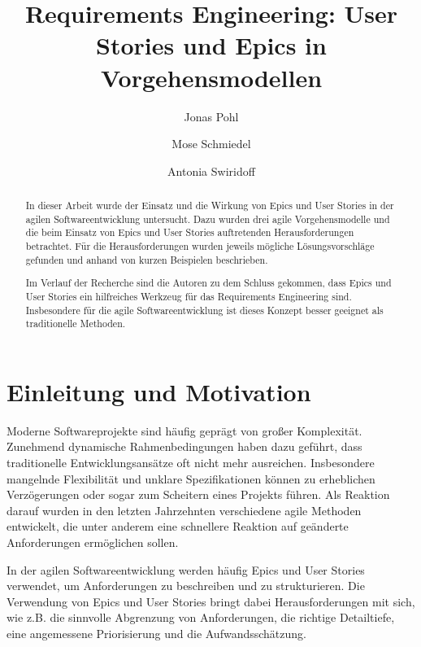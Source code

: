 \documentclass[acmtog]{acmart}
\begin{document}
\hypersetup{
	colorlinks,
	allcolors=blue,
	citecolor=.,
}

\title{Requirements Engineering: User Stories und Epics in Vorgehensmodellen}

\author{Jonas Pohl}
\author{Mose Schmiedel}
\authornotemark[1]
\author{Antonia Swiridoff}
\authornotemark[1]

\renewcommand{\shortauthors}{Pohl, Schmiedel and Swiridoff}

\begin{abstract}
	In dieser Arbeit wurde der Einsatz und die Wirkung von Epics und User Stories in der agilen Softwareentwicklung untersucht.
	Dazu wurden drei agile Vorgehensmodelle und die beim Einsatz von Epics und User Stories
	auftretenden Herausforderungen betrachtet.
	Für die Herausforderungen wurden jeweils mögliche Lösungsvorschläge gefunden und anhand von kurzen Beispielen beschrieben.

	Im Verlauf der Recherche sind die Autoren zu dem Schluss gekommen, dass Epics und User Stories ein hilfreiches Werkzeug
	für das Requirements Engineering sind. Insbesondere für die agile Softwareentwicklung ist dieses Konzept besser geeignet als traditionelle
	Methoden.
\end{abstract}

\maketitle

\section{Einleitung und Motivation}
Moderne Softwareprojekte sind häufig geprägt von großer Komplexität.
Zunehmend dynamische Rahmenbedingungen haben dazu geführt, dass traditionelle Entwicklungsansätze oft nicht mehr ausreichen.
Insbesondere mangelnde Flexibilität und unklare Spezifikationen können zu erheblichen Verzögerungen oder sogar zum Scheitern eines Projekts führen.
Als Reaktion darauf wurden in den letzten Jahrzehnten verschiedene agile Methoden entwickelt, die unter anderem eine schnellere Reaktion auf geänderte Anforderungen ermöglichen sollen.

In der agilen Softwareentwicklung werden häufig Epics und User Stories verwendet, um Anforderungen zu beschreiben und zu strukturieren.
Die Verwendung von Epics und User Stories bringt dabei Herausforderungen mit sich, wie z.B. die sinnvolle Abgrenzung von Anforderungen, die richtige Detailtiefe, eine angemessene Priorisierung und die Aufwandsschätzung.
\end{document}
